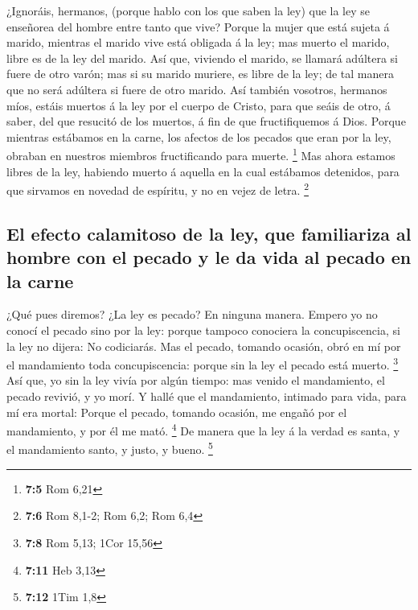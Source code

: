  ¿Ignoráis, hermanos, (porque hablo con los que saben la
ley) que la ley se enseñorea del hombre entre tanto que vive?
 Porque la mujer que está sujeta á marido, mientras el
marido vive está obligada á la ley; mas muerto el marido, libre es de la
ley del marido.  Así que, viviendo el marido, se llamará
adúltera si fuere de otro varón; mas si su marido muriere, es libre de
la ley; de tal manera que no será adúltera si fuere de otro marido.
 Así también vosotros, hermanos míos, estáis muertos á la
ley por el cuerpo de Cristo, para que seáis de otro, á saber, del que
resucitó de los muertos, á fin de que fructifiquemos á Dios.
 Porque mientras estábamos en la carne, los afectos de los
pecados que eran por la ley, obraban en nuestros miembros fructificando
para muerte. \footnote{\textbf{7:5} Rom 6,21}  Mas ahora
estamos libres de la ley, habiendo muerto á aquella en la cual estábamos
detenidos, para que sirvamos en novedad de espíritu, y no en vejez de
letra. \footnote{\textbf{7:6} Rom 8,1-2; Rom 6,2; Rom 6,4}

\hypertarget{el-efecto-calamitoso-de-la-ley-que-familiariza-al-hombre-con-el-pecado-y-le-da-vida-al-pecado-en-la-carne}{%
\subsection{El efecto calamitoso de la ley, que familiariza al hombre
con el pecado y le da vida al pecado en la
carne}\label{el-efecto-calamitoso-de-la-ley-que-familiariza-al-hombre-con-el-pecado-y-le-da-vida-al-pecado-en-la-carne}}

 ¿Qué pues diremos? ¿La ley es pecado? En ninguna manera.
Empero yo no conocí el pecado sino por la ley: porque tampoco conociera
la concupiscencia, si la ley no dijera: No codiciarás. 
Mas el pecado, tomando ocasión, obró en mí por el mandamiento toda
concupiscencia: porque sin la ley el pecado está muerto. \footnote{\textbf{7:8}
  Rom 5,13; 1Cor 15,56}  Así que, yo sin la ley vivía por
algún tiempo: mas venido el mandamiento, el pecado revivió, y yo morí.
 Y hallé que el mandamiento, intimado para vida, para mí
era mortal:  Porque el pecado, tomando ocasión, me engañó
por el mandamiento, y por él me mató. \footnote{\textbf{7:11} Heb 3,13}
 De manera que la ley á la verdad es santa, y el
mandamiento santo, y justo, y bueno. \footnote{\textbf{7:12} 1Tim 1,8}

